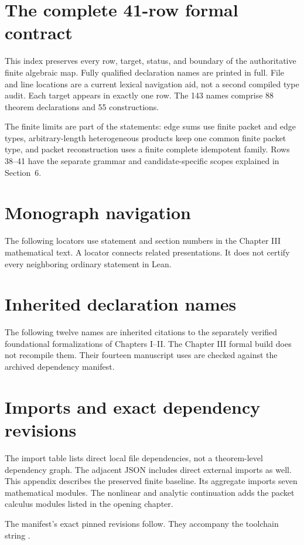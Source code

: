 \tableofcontents
\clearpage
{}

\clearpage







\clearpage
\section{The complete 41-row formal contract}\label{sec:map}
This index preserves every row, target, status, and boundary of the authoritative finite algebraic map. Fully qualified declaration names are printed in full. File and line locations are a current lexical navigation aid, not a second compiled type audit. Each target appears in exactly one row. The 143 names comprise 88 theorem declarations and 55 constructions.

The finite limits are part of the statements: edge sums use finite packet and edge types, arbitrary-length heterogeneous products keep one common finite packet type, and packet reconstruction uses a finite complete idempotent family. Rows 38--41 have the separate grammar and candidate-specific scopes explained in Section~6.

\clearpage
\appendix
\section{Monograph navigation}\label{app:crosswalk}
The following locators use statement and section numbers in the Chapter III mathematical text. A locator connects related presentations. It does not certify every neighboring ordinary statement in Lean.

\section{Inherited declaration names}\label{app:inherited}
The following twelve names are inherited citations to the separately verified foundational formalizations of Chapters I--II. The Chapter III formal build does not recompile them. Their fourteen manuscript uses are checked against the archived dependency manifest.

\clearpage
\section{Imports and exact dependency revisions}
The import table lists direct local file dependencies, not a theorem-level dependency graph. The adjacent JSON includes direct external imports as well. This appendix describes the preserved finite baseline. Its aggregate imports seven mathematical modules. The nonlinear and analytic continuation adds the packet calculus modules listed in the opening chapter.

The manifest's exact pinned revisions follow. They accompany the toolchain string .

\clearpage
